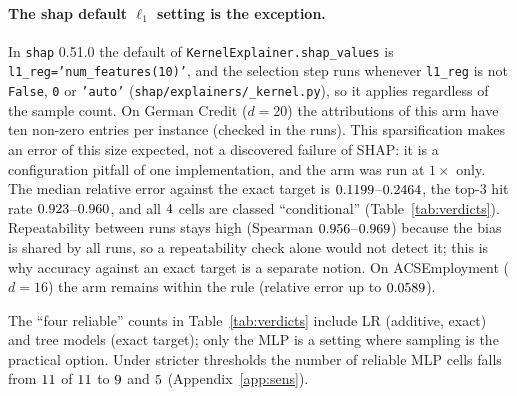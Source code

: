 \paragraph{The shap default $\ell_1$ setting is the exception.} In \texttt{shap} 0.51.0 the default of \texttt{KernelExplainer.shap\_values} is \texttt{l1\_reg='num\_features(10)'}, and the selection step runs whenever \texttt{l1\_reg} is not \texttt{False}, \texttt{0} or \texttt{'auto'} (\texttt{shap/explainers/\_kernel.py}), so it applies regardless of the sample count. On German Credit ($d{=}20$) the attributions of this arm have ten non-zero entries per instance (checked in the runs). This sparsification makes an error of this size expected, not a discovered failure of SHAP: it is a configuration pitfall of one implementation, and the arm was run at $1\times$ only. The median relative error against the exact target is $0.1199$--$0.2464$, the top-3 hit rate $0.923$--$0.960$, and all $4$ cells are classed ``conditional'' (Table~\ref{tab:verdicts}). Repeatability between runs stays high (Spearman $0.956$--$0.969$) because the bias is shared by all runs, so a repeatability check alone would not detect it; this is why accuracy against an exact target is a separate notion. On ACSEmployment ($d{=}16$) the arm remains within the rule (relative error up to $0.0589$).

\begin{table}[t]
\centering
\caption{Verdicts of the pre-stated decision rule (Sec.~\ref{sec:method}): number of the four models classed reliable, conditional or unreliable in each cell. Cell \texttt{kernel\_q}, \texttt{kernel\_1}, \texttt{kernel\_4}, \texttt{kernel\_16}: Kernel SHAP at $\nicefrac14,1,4,16\times$ the library budget with $\ell_1$ off; \texttt{l1default}: the library default at $1\times$; \texttt{perm}: permutation SHAP. $n{=}50$ instances, $R{=}20$ runs (20 instances at $16\times$). ACS Income and Pima are deterministic-regime controls. Per-model rows and the cells not run are in Appendix~\ref{app:cells}.}
\label{tab:verdicts}

\end{table}
\noindent The ``four reliable'' counts in Table~\ref{tab:verdicts} include LR (additive, exact) and tree models (exact target); only the MLP is a setting where sampling is the practical option. Under stricter thresholds the number of reliable MLP cells falls from $11$ of $11$ to $9$ and $5$ (Appendix~\ref{app:sens}).

